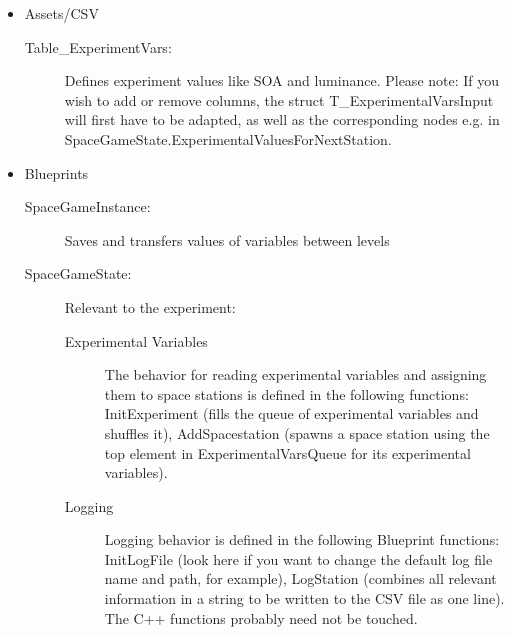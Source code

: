 \documentclass[11pt,a4paper]{article}
\begin{document}
    \begin{itemize}

    \item Assets/CSV
        \begin{description}
        \item[Table\_ExperimentVars:] Defines experiment values like SOA and luminance. Please note: If you wish to add or remove columns, the struct T\_ExperimentalVarsInput will first have to be adapted, as well as the corresponding nodes e.g. in SpaceGameState.ExperimentalValuesForNextStation.
        \end{description}

    \item Blueprints
        \begin{description}
        \item[SpaceGameInstance:] Saves and transfers values of variables between levels
        \item[SpaceGameState:] Relevant to the experiment:
        	\begin{description}
            \item[Experimental Variables]
                The behavior for reading experimental variables and assigning them to space stations is defined in the following functions: InitExperiment (fills the queue of experimental variables and shuffles it), AddSpacestation (spawns a space station using the top element in ExperimentalVarsQueue for its experimental variables).
            \item[Logging]
                Logging behavior is defined in the following Blueprint functions:
                InitLogFile (look here if you want to change the default log file name and path, for example), LogStation (combines all relevant information in a string to be written to the CSV file as one line). The C++ functions probably need not be touched.
            \end{description}
        \end{description}


\end{itemize}
\end{document}
